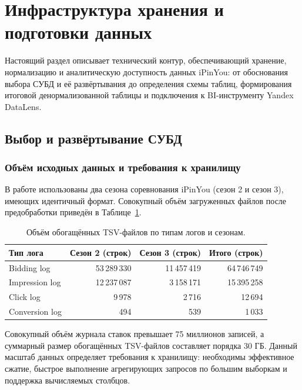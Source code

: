 \section{Инфраструктура хранения и подготовки данных}
\label{sec:data_preparation}

Настоящий раздел описывает технический контур, обеспечивающий хранение, нормализацию и аналитическую доступность данных iPinYou: от обоснования выбора СУБД и её развёртывания до определения схемы таблиц, формирования итоговой денормализованной таблицы и подключения к BI-инструменту Yandex DataLens.

\subsection{Выбор и развёртывание СУБД}
\label{subsec:clickhouse_deploy}

\subsubsection*{Объём исходных данных и требования к хранилищу}

В работе использованы два сезона соревнования iPinYou (сезон 2 и сезон 3), имеющих идентичный формат. Совокупный объём загруженных файлов после предобработки приведён в Таблице~\ref{tab:file_sizes}.

\begin{table}[h!]
\small
  \begin{center}
    \caption{Объём обогащённых TSV-файлов по типам логов и сезонам.}
    \label{tab:file_sizes}
    \renewcommand{\arraystretch}{1.15}
    \begin{tabular}{l|r|r|r}
      \textbf{Тип лога} & \textbf{Сезон 2 (строк)} & \textbf{Сезон 3 (строк)} & \textbf{Итого (строк)} \\
      \hline
      Bidding log  & 53\,289\,330 & 11\,457\,419 & 64\,746\,749 \\
      Impression log & 12\,237\,087 &  3\,158\,171 & 15\,395\,258 \\
      Click log    &      9\,978  &      2\,716  &     12\,694  \\
      Conversion log &        494  &        539  &      1\,033  \\
    \end{tabular}
  \end{center}
\end{table}

Совокупный объём журнала ставок превышает 75 миллионов записей, а суммарный размер обогащённых TSV-файлов составляет порядка 30 ГБ. Данный масштаб данных определяет требования к хранилищу: необходимы эффективное сжатие, быстрое выполнение агрегирующих запросов по большим выборкам и поддержка вычисляемых столбцов.

